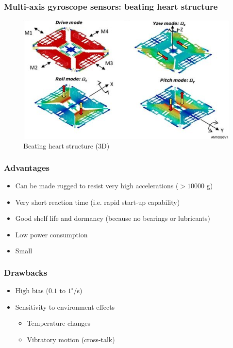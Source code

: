 \documentclass[10pt]{beamer}
\begin{document}
\begin{frame}
\frametitle{Multi-axis gyroscope sensors: beating heart structure}
    \begin{figure}
        \centering
        \includegraphics[width=0.9\linewidth]{demo_mems_gyro.png}
        \caption{Beating heart structure (3D)\cite{ST}}
    \end{figure}
\end{frame}


\begin{frame}
\frametitle{Advantages}
    \begin{itemize}
        \item Can be made rugged to resist very high accelerations ($> 10000$ g)
        \item Very short reaction time (i.e. rapid start-up capability)
        \item Good shelf life and dormancy (because no bearings or lubricants)
        \item Low power consumption
        \item Small
    \end{itemize}
\end{frame}

\begin{frame}
\frametitle{Drawbacks}
    \begin{itemize}
        \item High bias ($0.1$ to $1^{\circ}$/s)
        \item Sensitivity to environment effects
        \begin{itemize}
            \item Temperature changes
            \item Vibratory motion (cross-talk)
        \end{itemize}
    \end{itemize}
\end{frame}
\end{document}

